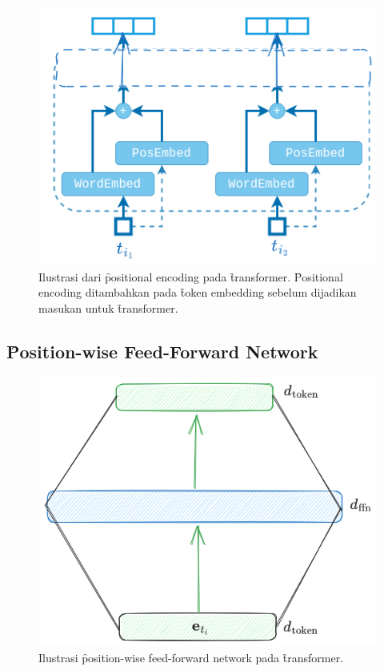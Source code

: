\begin{figure}
	\centering
	\includegraphics[width=1\textwidth]{assets/pics/positional_encoding.png}
	\caption{Ilustrasi dari \f{positional encoding} pada \f{transformer}. \f{Positional encoding} ditambahkan pada \f{token embedding} sebelum dijadikan masukan untuk \f{transformer}.}
	\label{fig:positional-encoding}
\end{figure}


\subsection{\f{Position-wise Feed-Forward Network}}

	\begin{figure}
		\centering
		\includegraphics[width=1\textwidth]{assets/pics/ffn_transformer.png}
		\caption{Ilustrasi \f{position-wise feed-forward network} pada \f{transformer}.}
		\label{fig:position-wise-feed-forward-network}
	\end{figure}

